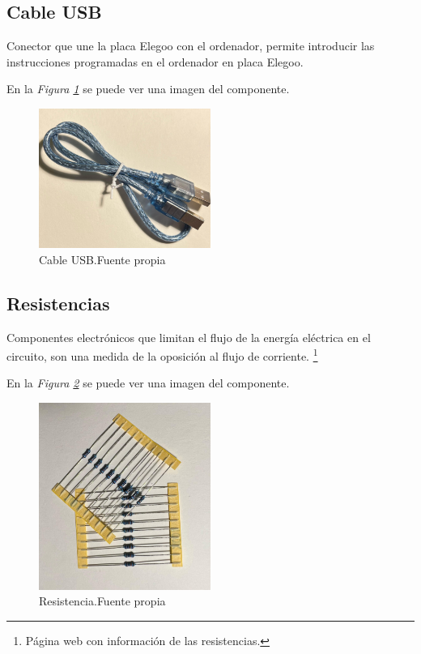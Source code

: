\subsection{Cable USB}
Conector que une la placa Elegoo con el ordenador, permite introducir las instrucciones programadas en el ordenador en placa Elegoo. 

En la \textit{Figura \ref{fig:Cable USB}} se puede ver una imagen del componente.
\begin{figure}[h]
        \centering
        \includegraphics[width=0.5\textwidth]{img/cable usb.png}
        \caption{Cable USB.Fuente propia}
        \label{fig:Cable USB}
    \end{figure}
   
\subsection{Resistencias}
Componentes electrónicos que limitan el flujo de la energía eléctrica en el circuito, son una medida de la oposición al flujo de corriente.  \cite{Resistencia}\footnote{Página web con información de las resistencias\cite{Resistencia}.}

En la \textit{Figura \ref{fig:Resistencias}} se puede ver una imagen del componente.
\begin{figure}[h]
        \centering
        \includegraphics[width=0.5\textwidth]{img/Resistencias.png}
        \caption{Resistencia.Fuente propia}
        \label{fig:Resistencias}
    \end{figure}
    
